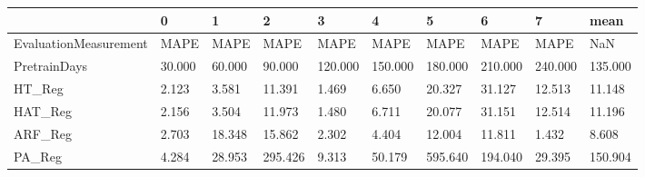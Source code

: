 \begin{tabular}{llllllllll}
\toprule
{} &      0 &      1 &       2 &       3 &       4 &       5 &       6 &       7 &    mean \\
\midrule
EvaluationMeasurement &   MAPE &   MAPE &    MAPE &    MAPE &    MAPE &    MAPE &    MAPE &    MAPE &     NaN \\
PretrainDays          & 30.000 & 60.000 &  90.000 & 120.000 & 150.000 & 180.000 & 210.000 & 240.000 & 135.000 \\
HT\_Reg                &  2.123 &  3.581 &  11.391 &   1.469 &   6.650 &  20.327 &  31.127 &  12.513 &  11.148 \\
HAT\_Reg               &  2.156 &  3.504 &  11.973 &   1.480 &   6.711 &  20.077 &  31.151 &  12.514 &  11.196 \\
ARF\_Reg               &  2.703 & 18.348 &  15.862 &   2.302 &   4.404 &  12.004 &  11.811 &   1.432 &   8.608 \\
PA\_Reg                &  4.284 & 28.953 & 295.426 &   9.313 &  50.179 & 595.640 & 194.040 &  29.395 & 150.904 \\
\bottomrule
\end{tabular}
